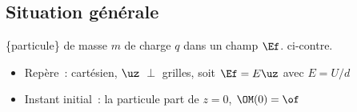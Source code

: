 \documentclass[../../main/main.tex]{subfiles}
\begin{document}
\subsection{Situation générale}\label{ssec:egen}
\begin{enumerate}[label=\sqenumi]
	\begin{minipage}[t]{0.70\linewidth}
		 \{particule\} de masse $m$ de charge $q$ dans un champ
		$\Ef$.
		 ci-contre.
		\begin{itemize}[label=$\diamond$, leftmargin=10pt]
			\item Repère~: cartésien, $\uz$ $\perp$ grilles,
			      soit $\Ef = E\uz$ avec $E = U/d$
			\item Instant initial~: la particule part de $z=0$, $\OM(0) = \of$
		\end{itemize}
		\psw{
			\[
				\begin{array}{ll}
					\textbf{Poids}            & \text{négligeable \textbf{devant }}\Ff \\
					\textbf{Force électrique} & \Ff = q\Ef = qE\uz
				\end{array}
			\]
		}
	\end{minipage}
	\hfill
	\begin{minipage}[t]{0.28\linewidth}
		~
		\begin{center}
\end{center}
\end{minipage}
\end{enumerate}
\end{document}
